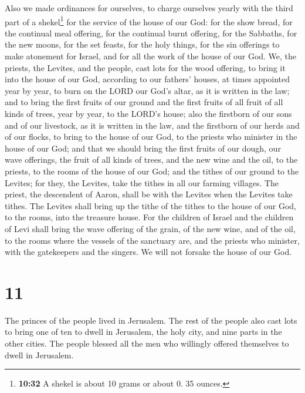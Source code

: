  Also we made ordinances for ourselves, to charge
ourselves yearly with the third part of a shekel\footnote{\textbf{10:32}
  A shekel is about 10 grams or about 0. 35 ounces.} for the service of
the house of our God:  for the show bread, for the
continual meal offering, for the continual burnt offering, for the
Sabbaths, for the new moons, for the set feasts, for the holy things,
for the sin offerings to make atonement for Israel, and for all the work
of the house of our God.  We, the priests, the Levites,
and the people, cast lots for the wood offering, to bring it into the
house of our God, according to our fathers' houses, at times appointed
year by year, to burn on the LORD our God's altar, as it is written in
the law;  and to bring the first fruits of our ground and
the first fruits of all fruit of all kinds of trees, year by year, to
the LORD's house;  also the firstborn of our sons and of
our livestock, as it is written in the law, and the firstborn of our
herds and of our flocks, to bring to the house of our God, to the
priests who minister in the house of our God;  and that
we should bring the first fruits of our dough, our wave offerings, the
fruit of all kinds of trees, and the new wine and the oil, to the
priests, to the rooms of the house of our God; and the tithes of our
ground to the Levites; for they, the Levites, take the tithes in all our
farming villages.  The priest, the descendent of Aaron,
shall be with the Levites when the Levites take tithes. The Levites
shall bring up the tithe of the tithes to the house of our God, to the
rooms, into the treasure house.  For the children of
Israel and the children of Levi shall bring the wave offering of the
grain, of the new wine, and of the oil, to the rooms where the vessels
of the sanctuary are, and the priests who minister, with the gatekeepers
and the singers. We will not forsake the house of our God.

\hypertarget{section-10}{%
\section{11}\label{section-10}}

 The princes of the people lived in Jerusalem. The rest of
the people also cast lots to bring one of ten to dwell in Jerusalem, the
holy city, and nine parts in the other cities.  The people
blessed all the men who willingly offered themselves to dwell in
Jerusalem.

